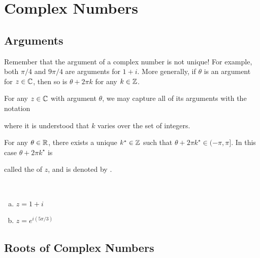 \documentclass[11pt,fleqn,dvipsnames,usenames]{article}
\renewcommand{\headrulewidth}{1pt}
\newcommand{\blank}[1]{\underline{\hspace{#1}}}
\newcommand{\p}{\noindent}
\begin{document}
\fancyhead[L]{\course}
\fancyhead[R]{\term}
\renewcommand{\headrulewidth}{0.4pt}


\setcounter{section}{2}
\section{Complex Numbers}
\setcounter{subsection}{4}
\subsection{Arguments}

\p Remember that the argument of a complex number is not unique!  For example, both $\pi/4$ and $9\pi/4$ are arguments for $1 + i$.  More generally, if $\theta$ is an argument for $z\in\mathbb{C}$, then so is $\theta + 2\pi k$ for any $k\in \mathbb{Z}$.
\vsp

\notation For any $z\in\mathbb{C}$ with argument $\theta$, we may capture all of its arguments with the notation
\vspace{2cm}

\p where it is understood that $k$ varies over the set of integers.
\vsp

\fact For any $\theta\in\mathbb{R}$, there exists a unique $k^{\star}\in\mathbb{Z}$ such that $\theta + 2\pi k^{\star}\in (-\pi, \pi]$.  In this case $\theta + 2\pi k^{\star}$ is\\
\vsmsp

\p called the  of $z$, and is denoted by \blank{1cm}.
\vsp

\begin{examples}~
\begin{enumerate}[(a)]
\item $z = 1 + i$
\vspace{1cm}

\item $z = e^{i(5\pi/3)}$
\vspace{1cm}

\end{enumerate}
\end{examples}

\subsection{Roots of Complex Numbers}\label{rootsofunitysection}
\end{document}

